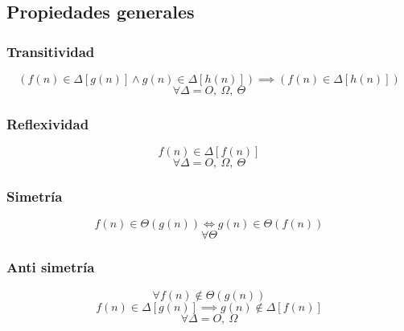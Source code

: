 \documentclass[tikz,11pt,fleqn]{book} %
\begin{document}

\subsection{Propiedades generales}
\subsubsection{Transitividad}
$$
(f(n)\in\Delta[g(n)] \land g(n)\in\Delta[h(n)])
\implies
(f(n)\in\Delta[h(n)]) $$ $$
\forall\Delta=O,~\Omega,~\Theta
$$
\subsubsection{Reflexividad}
$$
f(n)\in\Delta[f(n)] $$ $$
\forall\Delta=O,~\Omega,~\Theta
$$
\subsubsection{Simetría}
$$
f(n)\in\Theta(g(n))
\iff
g(n)\in\Theta(f(n))
$$ $$
\forall\Theta
$$
\subsubsection{Anti simetría}
$$
\forall f(n)\not\in \Theta(g(n))
$$ $$
f(n)\in\Delta[g(n)]
    \implies
g(n)\not\in\Delta[f(n)] $$ $$
\forall\Delta= O,~\Omega
$$
\end{document}
